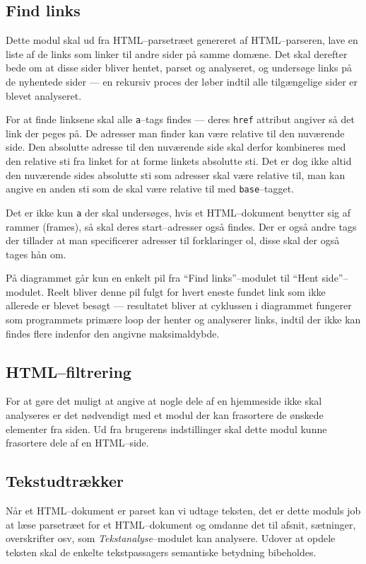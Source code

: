\documentclass[a4paper,oneside,article]{memoir}
\begin{document}
\subsection{Find links}
Dette modul skal ud fra HTML--parsetræet genereret af HTML--parseren,
lave en liste af de links som linker til andre sider på samme domæne.
Det skal derefter bede om at disse sider bliver hentet, parset og
analyseret, og undersøge links på de nyhentede sider --- en rekursiv
proces der løber indtil alle tilgængelige sider er blevet analyseret.

For at finde linksene skal alle \texttt{a}--tags findes --- deres
\texttt{href} attribut angiver så det link der peges på. De adresser
man finder kan være relative til den nuværende side. Den absolutte
adresse til den nuværende side skal derfor kombineres med den relative
sti fra linket for at forme linkets absolutte sti. Det er dog ikke
altid den nuværende sides absolutte sti som adresser skal være
relative til, man kan angive en anden sti som de skal være relative
til med \texttt{base}--tagget.

Det er ikke kun \texttt{a} der skal undersøges, hvis et HTML--dokument
benytter sig af rammer (frames), så skal deres start--adresser også
findes. Der er også andre tags der tillader at man specificerer
adresser til forklaringer ol, disse skal der også tages hån om.

På diagrammet går kun en enkelt pil fra ``Find links''--modulet til
``Hent side''--modulet. Reelt bliver denne pil fulgt for hvert eneste
fundet link som ikke allerede er blevet besøgt --- resultatet bliver at
cyklussen i diagrammet fungerer som programmets primære loop der
henter og analyserer links, indtil der ikke kan findes flere indenfor
den angivne maksimaldybde.

\subsection{HTML--filtrering}
For at gøre det muligt at angive at nogle dele af en hjemmeside ikke
skal analyseres er det nødvendigt med et modul der kan frasortere de
ønskede elementer fra siden. Ud fra brugerens indstillinger skal dette
modul kunne frasortere dele af en HTML--side.

\subsection{Tekstudtrækker}
Når et HTML--dokument er parset kan vi udtage teksten, det er dette
moduls job at læse parsetræet for et HTML--dokument og omdanne det til
afsnit, sætninger, overskrifter osv, som \textit{Tekstanalyse}--modulet
kan analysere. Udover at opdele teksten skal de enkelte tekstpassagers
semantiske betydning bibeholdes.
\end{document}
